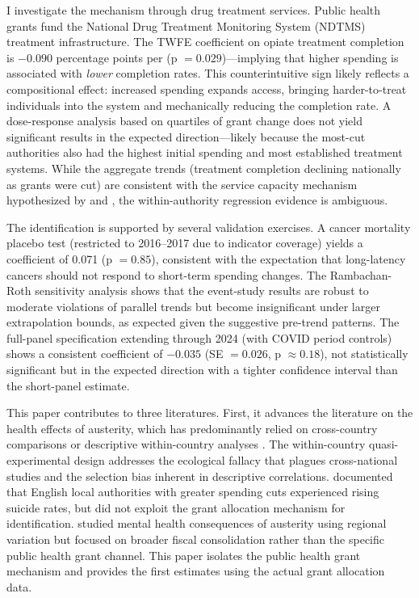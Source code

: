 \documentclass[12pt]{article}
\begin{document}
I investigate the mechanism through drug treatment services. Public health grants fund the National Drug Treatment Monitoring System (NDTMS) treatment infrastructure. The TWFE coefficient on opiate treatment completion is $-0.090$ percentage points per  (p $= 0.029$)---implying that higher spending is associated with \textit{lower} completion rates. This counterintuitive sign likely reflects a compositional effect: increased spending expands access, bringing harder-to-treat individuals into the system and mechanically reducing the completion rate. A dose-response analysis based on quartiles of grant change does not yield significant results in the expected direction---likely because the most-cut authorities also had the highest initial spending and most established treatment systems. While the aggregate trends (treatment completion declining nationally as grants were cut) are consistent with the service capacity mechanism hypothesized by \citet{dhsc2021} and \citet{black2020}, the within-authority regression evidence is ambiguous.

The identification is supported by several validation exercises. A cancer mortality placebo test (restricted to 2016--2017 due to indicator coverage) yields a coefficient of 0.071 (p $= 0.85$), consistent with the expectation that long-latency cancers should not respond to short-term spending changes. The Rambachan-Roth sensitivity analysis \citep{rambachan2023} shows that the event-study results are robust to moderate violations of parallel trends but become insignificant under larger extrapolation bounds, as expected given the suggestive pre-trend patterns. The full-panel specification extending through 2024 (with COVID period controls) shows a consistent coefficient of $-0.035$ (SE $= 0.026$, p $\approx 0.18$), not statistically significant but in the expected direction with a tighter confidence interval than the short-panel estimate.

This paper contributes to three literatures. First, it advances the literature on the health effects of austerity, which has predominantly relied on cross-country comparisons \citep{stuckler2013body, reeves2014, karanikolos2013} or descriptive within-country analyses \citep{loopstra2016, taylor2019}. The within-country quasi-experimental design addresses the ecological fallacy that plagues cross-national studies and the selection bias inherent in descriptive correlations. \citet{barr2015} documented that English local authorities with greater spending cuts experienced rising suicide rates, but did not exploit the grant allocation mechanism for identification. \citet{alexiou2021} studied mental health consequences of austerity using regional variation but focused on broader fiscal consolidation rather than the specific public health grant channel. This paper isolates the public health grant mechanism and provides the first estimates using the actual grant allocation data.
\end{document}
